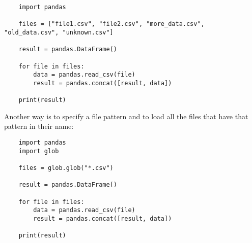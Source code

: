\begin{verbatim}
    import pandas

    files = ["file1.csv", "file2.csv", "more_data.csv", "old_data.csv", "unknown.csv"]

    result = pandas.DataFrame()

    for file in files:
        data = pandas.read_csv(file)
        result = pandas.concat([result, data])

    print(result)    
\end{verbatim}

Another way is to specify a file pattern and to load all the files that have that pattern in their name:

\begin{verbatim}
    import pandas
    import glob

    files = glob.glob("*.csv")

    result = pandas.DataFrame()

    for file in files:
        data = pandas.read_csv(file)
        result = pandas.concat([result, data])

    print(result)    
\end{verbatim}

